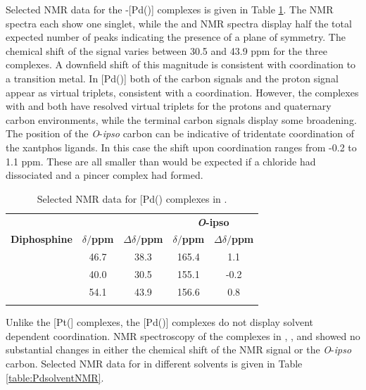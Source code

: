 Selected NMR data for the \trans-[Pd(\tBuxantphos)] complexes is given in Table \ref{table:PdClNMR}.  The \phosphorus{} NMR spectra each show one singlet, while the \proton{} and \carbon{} NMR spectra display half the total expected number of peaks indicating the presence of a plane of symmetry.  The chemical shift of the \phosphorus{} signal varies between 30.5 and 43.9 ppm for the three complexes.  A downfield shift of this magnitude is consistent with coordination to a transition metal.\cite{Pregosin2012}  In [Pd(\tBuxantphos)] both of the \tBu{} carbon signals and the proton signal appear as virtual triplets, consistent with a \trans{} coordination.  However, the complexes with \tBusixantphos{} and \tButhixantphos{} both have resolved virtual triplets for the \tBu{} protons and quaternary carbon environments, while the terminal carbon signals display some broadening.  The position of the \emph{O}-\emph{ipso} carbon can be indicative of tridentate coordination of the xantphos ligands.  In this case the shift upon coordination ranges from -0.2 to 1.1 ppm.  These are all smaller than would be expected if a chloride had dissociated and a pincer complex had formed.  

\begin{table}[htbp]
\caption[Selected NMR data for [Pd(\tBuxantphos)\ce{Cl2}{]} complexes]{Selected NMR data for [Pd(\tBuxantphos)\ce{Cl2}{]} complexes in .}
\label{table:PdClNMR}
\small
\begin{center}
\begin{tabular}{l c c c c}
	\toprule{}
	~~ & \multicolumn{2}{c}{\bfseries{\phosphorus}} & \multicolumn{2}{c}{\bfseries{\carbon} \emph{O}-ipso}\\
	\cmidrule(lr){2-3} \cmidrule(lr){4-5}
	\bfseries{Diphosphine}&\bfseries{$\delta/$ppm}&\bfseries{$\Delta\delta/$ppm}& \bfseries{$\delta/$ppm} & \bfseries{$\Delta\delta/$ppm}\\
	\midrule
	\tBuSixantphos 		& 46.7	& 38.3	& 165.4	& 1.1 \\
	\tBuThixantphos	& 40.0	& 30.5	& 155.1	& -0.2 \\
	\tBuXantphos		& 54.1	& 43.9	& 156.6	& 0.8	 \\
	\bottomrule{}
\end{tabular}
\end{center}
\end{table}

Unlike the [Pt(\tBuxantphos{}] complexes, the [Pd(\tBuxantphos)] complexes do not display solvent dependent coordination.  NMR spectroscopy of the complexes in , , and  showed no substantial changes in either the chemical shift of the \phosphorus{} NMR signal or the \emph{O}-\emph{ipso} carbon.  Selected NMR data for \tBusixantphos{} in different solvents is given in Table \ref{table:PdsolventNMR}.

